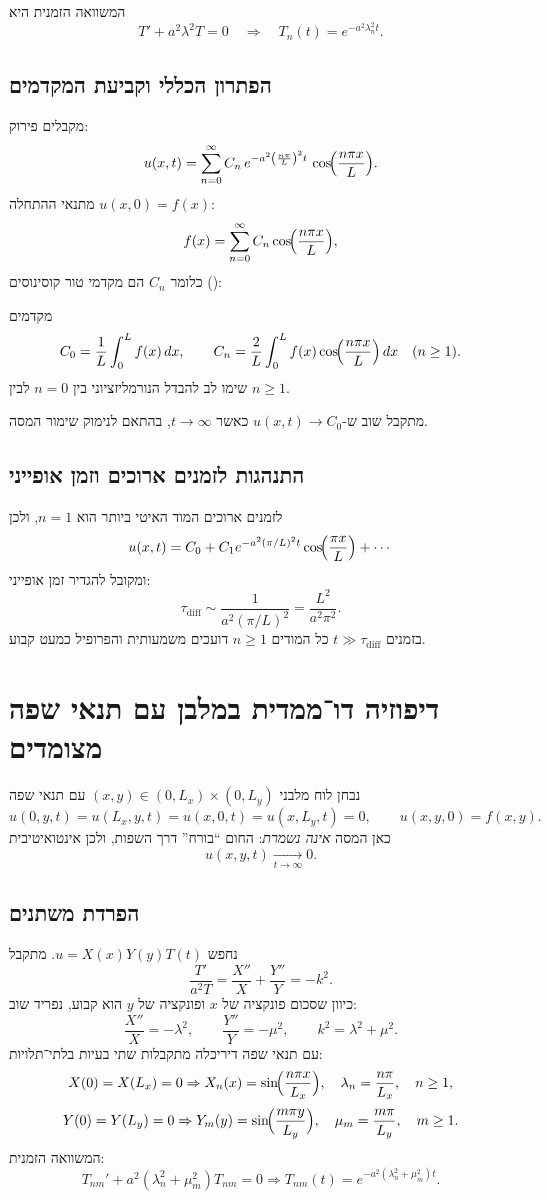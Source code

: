 המשוואה הזמנית היא
\[
T'+a^2\lambda^2 T=0
\quad\Rightarrow\quad
T_n(t)=e^{-a^2\lambda_n^2 t}.
\]

\subsection{הפתרון הכללי וקביעת המקדמים}
מקבלים פירוק:
\[
u(x,t)=\sum_{n=0}^\infty C_n\,e^{-a^2\left(\frac{n\pi}{L}\right)^2 t}\,
\cos\!\Bigl(\frac{n\pi x}{L}\Bigr).
\]
מתנאי ההתחלה \(u(x,0)=f(x)\):
\[
f(x)=\sum_{n=0}^\infty C_n\cos\!\Bigl(\frac{n\pi x}{L}\Bigr),
\]
כלומר \(C_n\) הם מקדמי טור קוסינוסים ():

\begin{resultbox}{מקדמים}
\[
C_0=\frac{1}{L}\int_0^L f(x)\,dx,
\qquad
C_n=\frac{2}{L}\int_0^L f(x)\cos\!\Bigl(\frac{n\pi x}{L}\Bigr)\,dx
\quad (n\ge 1).
\]
שימו לב להבדל הנורמליזציוני בין \(n=0\) לבין \(n\ge 1\).
\end{resultbox}

מתקבל שוב ש-\(u(x,t)\to C_0\) כאשר \(t\to\infty\), בהתאם לנימוק שימור המסה.

\subsection{התנהגות לזמנים ארוכים וזמן אופייני}
לזמנים ארוכים המוד האיטי ביותר הוא \(n=1\), ולכן
\[
u(x,t)=C_0 + C_1 e^{-a^2(\pi/L)^2 t}\cos\!\Bigl(\frac{\pi x}{L}\Bigr)+\cdots
\]
ומקובל להגדיר זמן אופייני:
\[
\tau_{\mathrm{diff}}\sim \frac{1}{a^2(\pi/L)^2}=\frac{L^2}{a^2\pi^2}.
\]
בזמנים \(t\gg \tau_{\mathrm{diff}}\) כל המודים \(n\ge 1\) דועכים משמעותית והפרופיל כמעט קבוע.

\section{דיפוזיה דו־ממדית במלבן עם תנאי שפה מצומדים}
נבחן לוח מלבני \((x,y)\in(0,L_x)\times(0,L_y)\) עם תנאי שפה
\[
u(0,y,t)=u(L_x,y,t)=u(x,0,t)=u(x,L_y,t)=0,
\qquad
u(x,y,0)=f(x,y).
\]
כאן המסה \emph{אינה נשמרת}: החום ``בורח'' דרך השפות, ולכן אינטואיטיבית
\[
u(x,y,t)\xrightarrow[t\to\infty]{}0.
\]

\subsection{הפרדת משתנים}
נחפש \(u=X(x)Y(y)T(t)\). מתקבל
\[
\frac{T'}{a^2 T}=\frac{X''}{X}+\frac{Y''}{Y}=-k^2.
\]
כיוון שסכום פונקציה של \(x\) ופונקציה של \(y\) הוא קבוע, נפריד שוב:
\[
\frac{X''}{X}=-\lambda^2,\qquad \frac{Y''}{Y}=-\mu^2,\qquad k^2=\lambda^2+\mu^2.
\]
עם תנאי שפה דיריכלה מתקבלות שתי בעיות  בלתי־תלויות:
\[
X(0)=X(L_x)=0 \Rightarrow X_n(x)=\sin\!\Bigl(\frac{n\pi x}{L_x}\Bigr),\quad
\lambda_n=\frac{n\pi}{L_x},\quad n\ge 1,
\]
\[
Y(0)=Y(L_y)=0 \Rightarrow Y_m(y)=\sin\!\Bigl(\frac{m\pi y}{L_y}\Bigr),\quad
\mu_m=\frac{m\pi}{L_y},\quad m\ge 1.
\]
המשוואה הזמנית:
\[
T_{nm}' + a^2(\lambda_n^2+\mu_m^2)T_{nm}=0
\Rightarrow
T_{nm}(t)=e^{-a^2(\lambda_n^2+\mu_m^2)t}.
\]

